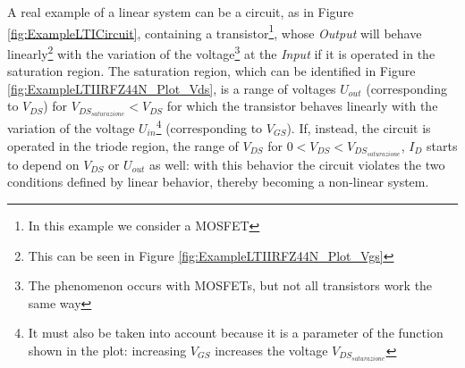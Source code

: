 \documentclass[a4paper, 10pt, final]{article} %
\begin{document}
    A real example of a linear system can be a circuit, as in Figure \ref{fig:ExampleLTICircuit}, containing a transistor\footnote{In this example we consider a MOSFET}, whose \emph{Output} will behave linearly\footnote{This can be seen in Figure \ref{fig:ExampleLTIIRFZ44N_Plot_Vgs}} with the variation of the voltage\footnote{The phenomenon occurs with MOSFETs, but not all transistors work the same way} at the \emph{Input} if it is operated in the saturation region.
    The saturation region, which can be identified in Figure \ref{fig:ExampleLTIIRFZ44N_Plot_Vds}, is a range of voltages $U_{out}$ (corresponding to $V_{DS}$) for $V_{DS_{saturazione}} < V_{DS}$ for which the transistor behaves linearly with the variation of the voltage $U_{in}$\footnote{It must also be taken into account because it is a parameter of the function shown in the plot: increasing $V_{GS}$ increases the voltage $V_{DS_{saturazione}}$} (corresponding to $V_{GS}$).
    If, instead, the circuit is operated in the triode region, the range of $V_{DS}$ for $0 < V_{DS} < V_{DS_{saturazione}}$, $I_D$ starts to depend on $V_{DS}$ or $U_{out}$ as well: with this behavior the circuit violates the two conditions defined by linear behavior, thereby becoming a non-linear system.
\end{document}
